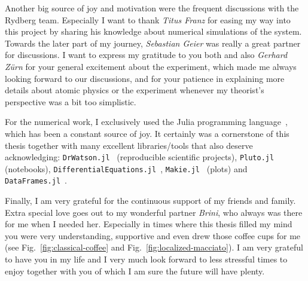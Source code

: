 Another big source of joy and motivation were the frequent discussions with the Rydberg team. Especially I want to thank \emph{Titus Franz} for easing my way into this project by sharing his knowledge about numerical simulations of the system. Towards the later part of my journey, \emph{Sebastian Geier} was really a great partner for discussions. I want to express my gratitude to you both and also \emph{Gerhard Zürn} for your general excitement about the experiment, which made me always looking forward to our discussions, and for your patience in explaining more details about atomic physics or the experiment whenever my theorist's perspective was a bit too simplistic.


%

For the numerical work, I exclusively used the Julia programming language~\cite{bezansonJuliaFreshApproach2017}, which has been a constant source of joy. It certainly was a cornerstone of this thesis together with many excellent libraries/tools that also deserve acknowledging: \texttt{DrWatson.jl}~\cite{datserisDrWatsonPerfectSidekick2020} (reproducible scientific projects), \texttt{Pluto.jl}~\cite{fonsvanderplasFonspPlutoJl2024} (notebooks), \texttt{DifferentialEquations.jl}~\cite{rackauckas2017differentialequations}, \texttt{Makie.jl}~\cite{danischMakieJlFlexible2021} (plots) and \texttt{DataFrames.jl}~\cite{bouchet-valatDataframesJlFlexible2023}.


Finally, I am very grateful for the continuous support of my friends and family. Extra special love goes out to my wonderful partner \emph{Brini}, who always was there for me when I needed her. Especially in times where this thesis filled my mind you were very understanding, supportive and even drew those coffee cups for me (see Fig.~\ref{fig:classical-coffee} and Fig.~\ref{fig:localized-macciato}).
I am very grateful to have you in my life and I very much look forward to less stressful times to enjoy together with you of which I am sure the future will have plenty.

\endgroup
